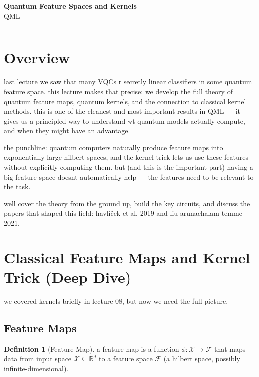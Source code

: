 \documentclass[11pt,a4paper]{article}
\theoremstyle{definition}
\newtheorem{definition}{Definition}[section]
\theoremstyle{remark}
\begin{document}
\begin{center}
    {\LARGE \textbf{Quantum Feature Spaces and Kernels}}\\[8pt]
    {\large QML}\\[12pt]
    \hrule
\end{center}

\vspace{12pt}
\tableofcontents
\newpage

\section{Overview}

last lecture we saw that many VQCs r secretly linear classifiers in some quantum feature space. this lecture makes that precise: we develop the full theory of quantum feature maps, quantum kernels, and the connection to classical kernel methods. this is one of the cleanest and most important results in QML --- it gives us a principled way to understand wt quantum models actually compute, and when they might have an advantage.

the punchline: quantum computers naturally produce feature maps into exponentially large hilbert spaces, and the kernel trick lets us use these features without explicitly computing them. but (and this is the important part) having a big feature space doesnt automatically help --- the features need to be relevant to the task.

well cover the theory from the ground up, build the key circuits, and discuss the papers that shaped this field: havl\'i\v{c}ek et al. 2019 and liu-arunachalam-temme 2021.

\section{Classical Feature Maps and Kernel Trick (Deep Dive)}

we covered kernels briefly in lecture 08, but now we need the full picture.

\subsection{Feature Maps}

\begin{definition}[Feature Map]
a feature map is a function $\phi: \mathcal{X} \to \mathcal{F}$ that maps data from input space $\mathcal{X} \subseteq \mathbb{R}^d$ to a feature space $\mathcal{F}$ (a hilbert space, possibly infinite-dimensional).
\end{definition}
\end{document}
